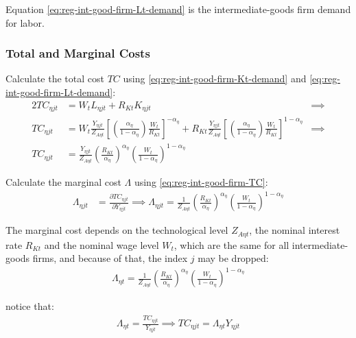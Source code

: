 \documentclass[
thesis.tex
]{subfiles}
\begin{document}
Equation \ref{eq:reg-int-good-firm-Lt-demand} is the intermediate-goods firm demand for labor.

\subsubsection*{Total and Marginal Costs}

Calculate the total cost $TC$ using \ref{eq:reg-int-good-firm-Kt-demand} and \ref{eq:reg-int-good-firm-Lt-demand}:
\begin{alignat}{2}
	TC_{\eta jt} & = W_t L_{\eta jt} + R_{Kt} K_{\eta jt} &\implies \nonumber \\
	TC_{\eta jt} & = W_t \frac{Y_{\eta jt}}{Z_{A\eta t}} \left[ \left( \frac{{\alpha_{\eta}}}{1-{\alpha_{\eta}}} \right) \frac{W_t}{R_{Kt}} \right]^{-{\alpha_{\eta}}} + R_{Kt} \frac{Y_{\eta jt}}{Z_{A\eta t}} \left[ \left( \frac{{\alpha_{\eta}}}{1-{\alpha_{\eta}}} \right) \frac{W_t}{R_{Kt}} \right]^{1-{\alpha_{\eta}}} &\implies \nonumber \\
	TC_{\eta jt} & = \frac{Y_{\eta jt}}{Z_{A\eta t}} \left( \frac{R_{Kt}}{{\alpha_{\eta}}} \right)^{{\alpha_{\eta}}} \left( \frac{W_t}{1-{\alpha_{\eta}}} \right)^{1-{\alpha_{\eta}}} \label{eq:reg-int-good-firm-TC}
\end{alignat}


Calculate the marginal cost $\Lambda$ using \ref{eq:reg-int-good-firm-TC}: 
\begin{align}
	\Lambda_{\eta jt} & = \frac{\partial TC_{\eta jt}}{\partial Y_{\eta jt}} \implies 
	\Lambda_{\eta jt} = \frac{1}{Z_{A\eta t}} \left( \frac{R_{Kt}}{{\alpha_{\eta}}} \right)^{{\alpha_{\eta}}} \left( \frac{W_t}{1-{\alpha_{\eta}}} \right)^{1-{\alpha_{\eta}}} \label{eq:reg-int-good-firm-MC}
\end{align}

The marginal cost depends on the technological level $Z_{A\eta t}$, the nominal interest rate $R_{Kt}$ and the nominal wage level $W_t$, which are the same for all intermediate-goods firms, and because of that, the index $j$ may be dropped:
\begin{align}
	\label{eq:reg-int-good-firm-MC-2}
	\Lambda_{\eta t} = \frac{1}{Z_{A\eta t}} \left( \frac{R_{Kt}}{{\alpha_{\eta}}} \right)^{{\alpha_{\eta}}} \left( \frac{W_t}{1-{\alpha_{\eta}}} \right)^{1-{\alpha_{\eta}}}
\end{align}

notice that:
\begin{align}
	\label{eq:reg-int-good-firm-TC-MC}
	\Lambda_{\eta t} = \frac{TC_{\eta jt}}{Y_{\eta jt}} \implies 
	TC_{\eta jt} = \Lambda_{\eta t} Y_{\eta jt}
\end{align}
\end{document}
